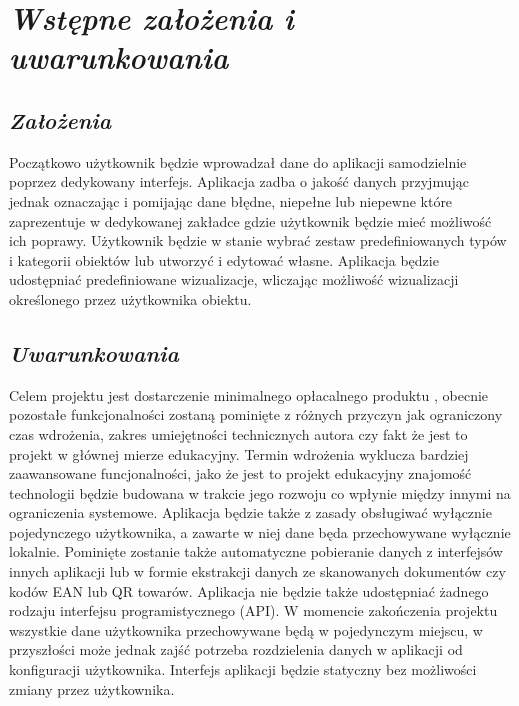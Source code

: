 \documentclass[a4paper,10pt]{report}
\newcommand{\customstylechapter}[1]{\large{\textit{#1}}}
\newcommand{\customstylesection}[1]{\textbf{\textit{#1}}}
\begin{document}
\chapter{\customstylechapter{Wstępne założenia i uwarunkowania}}
\section{\customstylesection{Założenia}}
{Początkowo użytkownik będzie wprowadzał dane do aplikacji samodzielnie poprzez 
dedykowany interfejs. Aplikacja zadba o jakość danych przyjmując jednak 
oznaczając i pomijając dane błędne, niepełne lub niepewne które zaprezentuje w 
dedykowanej zakładce gdzie użytkownik będzie mieć możliwość ich poprawy. 
Użytkownik będzie w stanie wybrać zestaw predefiniowanych typów i kategorii 
obiektów lub utworzyć i edytować własne. Aplikacja będzie udostępniać 
predefiniowane wizualizacje, wliczając możliwość wizualizacji określonego 
przez użytkownika obiektu.}
%
\section{\customstylesection{Uwarunkowania}}
{Celem projektu jest dostarczenie minimalnego opłacalnego produktu \cite{MVP}, 
obecnie pozostałe funkcjonalności zostaną pominięte z różnych przyczyn jak 
ograniczony czas wdrożenia, zakres umiejętności technicznych autora czy fakt że 
jest to projekt w głównej mierze edukacyjny. Termin wdrożenia wyklucza bardziej 
zaawansowane funcjonalności, jako że jest to projekt edukacyjny znajomość 
technologii będzie budowana w trakcie jego rozwoju co wpłynie między innymi na 
ograniczenia systemowe. Aplikacja będzie także z zasady obsługiwać wyłącznie 
pojedynczego użytkownika, a zawarte w niej dane będa  przechowywane wyłącznie 
lokalnie. Pominięte zostanie także automatyczne pobieranie danych z interfejsów 
innych aplikacji lub w formie ekstrakcji danych ze skanowanych dokumentów czy 
kodów EAN lub QR towarów. Aplikacja nie będzie także udostępniać żadnego rodzaju
 interfejsu programistycznego (API). W momencie zakończenia projektu wszystkie 
dane użytkownika przechowywane będą w pojedynczym miejscu, w przyszłości może 
jednak zajść potrzeba rozdzielenia danych w aplikacji od konfiguracji 
użytkownika. Interfejs aplikacji będzie statyczny bez możliwości zmiany przez 
użytkownika.}
%
\end{document}
